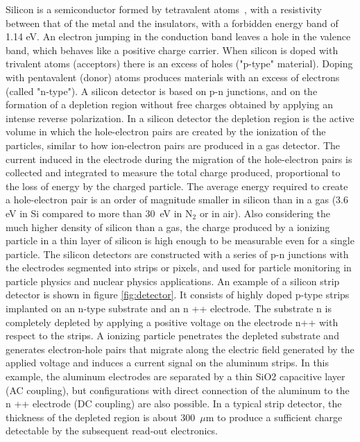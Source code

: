 \noindent Silicon is a semiconductor formed by tetravalent atoms~\cite{detector}, with a resistivity between that of the metal and the insulators, with a forbidden energy band of 1.14 eV.
An electron jumping in the conduction band leaves a hole in the valence band, which behaves like a positive charge carrier.
When silicon is doped with trivalent atoms (acceptors) there is an excess of holes ("p-type" material).
Doping with pentavalent (donor) atoms produces materials with an excess of electrons (called "n-type").
\newline
A silicon detector is based on p-n junctions, and on the formation of a depletion region without free charges obtained by applying an intense reverse polarization.
In a silicon detector the depletion region is the active volume in which the hole-electron pairs are created by the ionization of the particles, similar to how ion-electron pairs are produced in a gas detector.
The current induced in the electrode during the migration of the hole-electron pairs is collected and integrated to measure the total charge produced, proportional to the loss of energy by the charged particle.
\newline
The average energy required to create a hole-electron pair is an order of magnitude smaller in silicon than in a gas (3.6 eV in Si compared to more than 30~eV in N$_2$ or in air).
Also considering the much higher density of silicon than a gas, the charge produced by a ionizing particle in a thin layer of silicon is high enough to be measurable even for a single particle.
\newline
The silicon detectors are constructed with a series of p-n junctions with the electrodes segmented into strips or pixels, and used for particle monitoring in particle physics and nuclear physics applications.
An example of a silicon strip detector is shown in figure \ref{fig:detector}. It consists of highly doped p-type strips implanted on an n-type substrate and an n ++ electrode.
The substrate n is completely depleted by applying a positive voltage on the electrode n++ with respect to the strips.
A ionizing particle penetrates the depleted substrate and generates electron-hole pairs that migrate along the electric field generated by the applied voltage and induces a current signal on the aluminum strips.
In this example, the aluminum electrodes are separated by a thin SiO2 capacitive layer (AC coupling), but configurations with direct connection of the aluminum to the n ++ electrode (DC coupling) are also possible.
In a typical strip detector, the thickness of the depleted region is about 300~$\mu$m to produce a sufficient charge detectable by the subsequent read-out electronics. 
